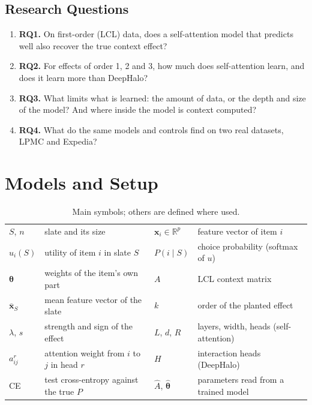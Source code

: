 \documentclass[11pt,a4paper]{article}
\numberwithin{table}{section}
\numberwithin{figure}{section}
\numberwithin{equation}{section}
\begin{document}
\subsection{Research Questions}
\begin{enumerate}
\item \textbf{RQ1.} On first-order (LCL) data, does a self-attention model that predicts well also recover the true context effect?
\item \textbf{RQ2.} For effects of order 1, 2 and 3, how much does self-attention learn, and does it learn more than DeepHalo?
\item \textbf{RQ3.} What limits what is learned: the amount of data, or the depth and size of the model? And where inside the model is context computed?
\item \textbf{RQ4.} What do the same models and controls find on two real datasets, LPMC and Expedia?
\end{enumerate}

\section{Models and Setup}

\begin{table}[h]
\centering\small
\caption{Main symbols; others are defined where used.}\label{tab:symbols}
\begin{tabular}{@{}ll@{\hspace{1.5em}}ll@{}}
\toprule
$S$, $n$ & slate and its size & $\mathbf{x}_i\in\mathbb{R}^p$ & feature vector of item $i$\\
$u_i(S)$ & utility of item $i$ in slate $S$ & $P(i\mid S)$ & choice probability (softmax of $u$)\\
$\bm\theta$ & weights of the item's own part & $A$ & LCL context matrix\\
$\bar{\mathbf x}_S$ & mean feature vector of the slate & $k$ & order of the planted effect\\
$\lambda$, $s$ & strength and sign of the effect & $L$, $d$, $R$ & layers, width, heads (self-attention)\\
$a^r_{ij}$ & attention weight from $i$ to $j$ in head $r$ & $H$ & interaction heads (DeepHalo)\\
CE & test cross-entropy against the true $P$ & $\hat A$, $\hat{\bm\theta}$ & parameters read from a trained model\\
\bottomrule
\end{tabular}
\end{table}
\end{document}
